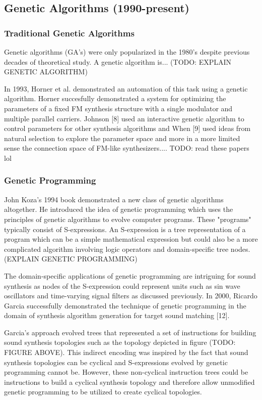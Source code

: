 \documentclass[12pt]{article}
\begin{document}
\subsection{Genetic Algorithms (1990-present)}
\subsubsection{Traditional Genetic Algorithms}
Genetic algorithms (GA's) were only popularized in the 1980's despite previous decades of theoretical study. A genetic algorithm is... (TODO: EXPLAIN GENETIC ALGORITHM)

In 1993, Horner et al. demonstrated an automation of this task using a genetic algorithm. Horner succesfully demonstrated a system for optimizing the parameters of a fixed FM synthesis structure with a single modulator and multiple parallel carriers. Johnson [8] used an interactive genetic algorithm to control parameters for other synthesis algorithms and When [9] used ideas from natural selection to explore the parameter space and more in a more limited sense the connection space of FM-like synthesizers.... TODO: read these papers lol

\subsubsection{Genetic Programming}
John Koza's 1994 book demonstrated a new class of genetic algorithms altogether. He introduced the idea of genetic programming which uses the principles of genetic algorithms to evolve computer programs. These "programs" typically consist of S-expressions. An S-expression is a tree representation of a program which can be a simple mathematical expression but could also be a more complicated algorithm involving logic operators and domain-specific tree nodes. (EXPLAIN GENETIC PROGRAMMING)
			
The domain-specific applications of genetic programming are intriguing for sound synthesis as nodes of the S-expression could represent units such as sin wave oscillators and time-varying signal filters as discussed previously. In 2000, Ricardo Garcia successfully demonstrated the technique of genetic programming in the domain of synthesis algorithm generation for target sound matching [12].

Garcia's approach evolved trees that represented a set of instructions for building sound synthesis topologies such as the topology depicted in figure (TODO: FIGURE ABOVE). This indirect encoding was inspired by the fact that sound synthesis topologies can be cyclical and S-expressions evolved by genetic programming cannot be. However, these non-cyclical instruction trees could be instructions to build a cyclical synthesis topology and therefore allow unmodified genetic programming to be utilized to create cyclical topologies.
\end{document}
